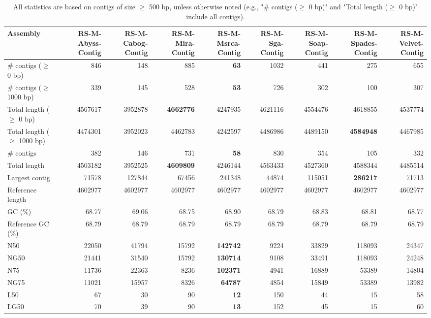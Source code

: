 \documentclass[12pt,a4paper]{article}
\begin{document}
\begin{table}[ht]
\begin{center}
\caption{All statistics are based on contigs of size $\geq$ 500 bp, unless otherwise noted (e.g., "\# contigs ($\geq$ 0 bp)" and "Total length ($\geq$ 0 bp)" include all contigs).}
\begin{tabular}{|l*{8}{|r}|}
\hline
Assembly & RS-M-Abyss-Contig & RS-M-Cabog-Contig & RS-M-Mira-Contig & RS-M-Msrca-Contig & RS-M-Sga-Contig & RS-M-Soap-Contig & RS-M-Spades-Contig & RS-M-Velvet-Contig \\ \hline
\# contigs ($\geq$ 0 bp) & 846 & 148 & 885 & {\bf 63} & 1032 & 441 & 275 & 655 \\ \hline
\# contigs ($\geq$ 1000 bp) & 339 & 145 & 528 & {\bf 53} & 726 & 302 & 100 & 307 \\ \hline
Total length ($\geq$ 0 bp) & 4567617 & 3952878 & {\bf 4662776} & 4247935 & 4621116 & 4554476 & 4618855 & 4537774 \\ \hline
Total length ($\geq$ 1000 bp) & 4474301 & 3952023 & 4462783 & 4242597 & 4486986 & 4489150 & {\bf 4584948} & 4467985 \\ \hline
\# contigs & 382 & 146 & 731 & {\bf 58} & 830 & 354 & 105 & 332 \\ \hline
Total length & 4503182 & 3952525 & {\bf 4609809} & 4246144 & 4563433 & 4527360 & 4588344 & 4485514 \\ \hline
Largest contig & 71578 & 127844 & 67456 & 241348 & 44874 & 115051 & {\bf 286217} & 71713 \\ \hline
Reference length & 4602977 & 4602977 & 4602977 & 4602977 & 4602977 & 4602977 & 4602977 & 4602977 \\ \hline
GC (\%) & 68.77 & 69.06 & 68.75 & 68.90 & 68.79 & 68.83 & 68.81 & 68.77 \\ \hline
Reference GC (\%) & 68.79 & 68.79 & 68.79 & 68.79 & 68.79 & 68.79 & 68.79 & 68.79 \\ \hline
N50 & 22050 & 41794 & 15792 & {\bf 142742} & 9224 & 33829 & 118093 & 24347 \\ \hline
NG50 & 21441 & 31540 & 15792 & {\bf 130714} & 9108 & 33491 & 118093 & 24248 \\ \hline
N75 & 11736 & 22363 & 8236 & {\bf 102371} & 4941 & 16889 & 53389 & 14804 \\ \hline
NG75 & 11021 & 15957 & 8326 & {\bf 64787} & 4854 & 15849 & 53389 & 13982 \\ \hline
L50 & 67 & 30 & 90 & {\bf 12} & 150 & 44 & 15 & 58 \\ \hline
LG50 & 70 & 39 & 90 & {\bf 13} & 152 & 45 & 15 & 60 \\ \hline

\end{tabular}
\end{center}
\end{table}
\end{document}
